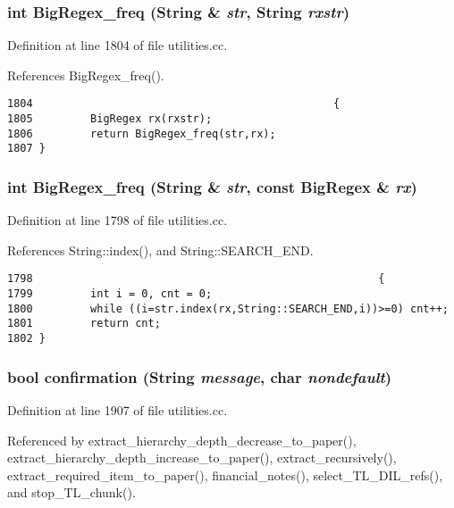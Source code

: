 \subsubsection{\setlength{\rightskip}{0pt plus 5cm}int Big\-Regex\_\-freq ({\bf String} \& {\em str}, {\bf String} {\em rxstr})}\label{utilities_8cc_a16}




Definition at line 1804 of file utilities.cc.

References Big\-Regex\_\-freq().



\footnotesize\begin{verbatim}1804                                               {
1805         BigRegex rx(rxstr);
1806         return BigRegex_freq(str,rx);
1807 }
\end{verbatim}\normalsize 
{}
\subsubsection{\setlength{\rightskip}{0pt plus 5cm}int Big\-Regex\_\-freq ({\bf String} \& {\em str}, const {\bf Big\-Regex} \& {\em rx})}\label{utilities_8cc_a15}




Definition at line 1798 of file utilities.cc.

References String::index(), and String::SEARCH\_\-END.



\footnotesize\begin{verbatim}1798                                                      {
1799         int i = 0, cnt = 0;
1800         while ((i=str.index(rx,String::SEARCH_END,i))>=0) cnt++;
1801         return cnt;
1802 }
\end{verbatim}\normalsize 
{}
\subsubsection{\setlength{\rightskip}{0pt plus 5cm}bool confirmation ({\bf String} {\em message}, char {\em nondefault})}\label{utilities_8cc_a28}




Definition at line 1907 of file utilities.cc.

Referenced by extract\_\-hierarchy\_\-depth\_\-decrease\_\-to\_\-paper(), extract\_\-hierarchy\_\-depth\_\-increase\_\-to\_\-paper(), extract\_\-recursively(), extract\_\-required\_\-item\_\-to\_\-paper(), financial\_\-notes(), select\_\-TL\_\-DIL\_\-refs(), and stop\_\-TL\_\-chunk().




